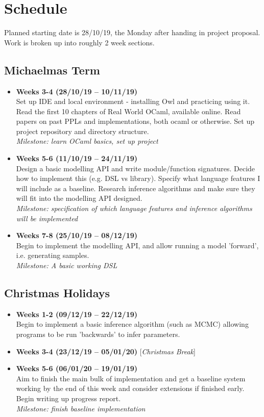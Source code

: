\section*{Schedule}
Planned starting date is {28/10/19}, the Monday after handing in project proposal. Work is broken up into roughly 2 week sections.

\subsection*{Michaelmas Term}
\begin{itemize}
	\item {\bf Weeks 3-4 (28/10/19 -- 10/11/19)} \\ Set up IDE and local environment - installing Owl and practicing using it. Read the first 10 chapters of Real World OCaml, available online. Read papers on past PPLs and implementations, both ocaml or otherwise. Set up project repository and directory structure.
	      \\ \textit{Milestone: learn OCaml basics, set up project}
	\item \textbf{Weeks 5-6 (11/10/19 -- 24/11/19)}\\ Design a basic modelling API and write module/function signatures. Decide how to implement this (e.g. DSL vs library). Specify what language features I will include as a baseline. Research inference algorithms and make sure they will fit into the modelling API designed.
	      \\ \textit{Milestone: specification of which language features and inference algorithms will be implemented}
	\item \textbf{Weeks 7-8 (25/10/19 -- 08/12/19)}\\ Begin to implement the modelling API, and allow running a model 'forward', i.e. generating samples.
	      \\ \textit{Milestone: A basic working DSL}
\end{itemize}
\subsection*{Christmas Holidays}
\begin{itemize}
	\item \textbf{Weeks 1-2 (09/12/19 -- 22/12/19)}\\ Begin to implement a basic inference algorithm (such as MCMC) allowing programs to be run 'backwards' to infer parameters.
	\item \textbf{Weeks 3-4 (23/12/19 -- 05/01/20)} [\textit{Christmas Break}]
	\item \textbf{Weeks 5-6 (06/01/20 -- 19/01/19)}\\ Aim to finish the main bulk of implementation and get a baseline system working by the end of this week and consider extensions if finished early. Begin writing up progress report.
	      \\ \textit{Milestone: finish baseline implementation}
\end{itemize}
